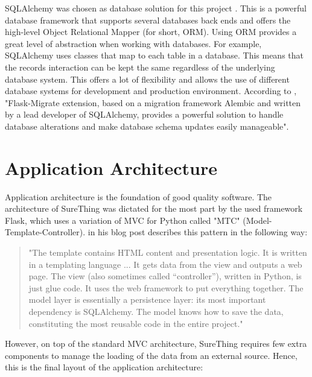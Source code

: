 SQLAlchemy was chosen as database solution for this project \citep{documentation:SqlAlchemy}. This is a powerful database framework that supports several databases back ends and offers the high-level Object Relational Mapper (for short, ORM). Using ORM provides a great level of abstraction when working with databases. For example, SQLAlchemy uses classes that map to each table in a database. This means that the records interaction can be kept the same regardless of the underlying database system. This offers a lot of flexibility and allows the use of different database systems for development and production environment. According to \citet{book:Grindberg2014FlaskWebDevelopment}, "Flask-Migrate extension, based on a migration framework Alembic and written by a lead developer of SQLAlchemy, provides a powerful solution to handle database alterations and make database schema updates easily manageable".

\section{Application Architecture}
\label{sec:applicationarchitecture}
Application architecture is the foundation of good quality software. The architecture of SureThing was dictated for the most part by the used framework Flask, which uses a variation of MVC for Python called "MTC" (Model-Template-Controller). \citet{article:goodArchitecture} in his blog post describes this pattern in the following way:

\begin{quote}
"The template contains HTML content and presentation logic. It is written in a templating language ... It gets data from the view and outputs a web page. The view (also sometimes called “controller”), written in Python, is just glue code. It uses the web framework to put everything together. The model layer is essentially a persistence layer: its most important dependency is SQLAlchemy. The model knows how to save the data, constituting the most reusable code in the entire project."
\end{quote}

However, on top of the standard MVC architecture, SureThing requires few extra components to manage the loading of the data from an external source. Hence, this is the final layout of the application architecture:

